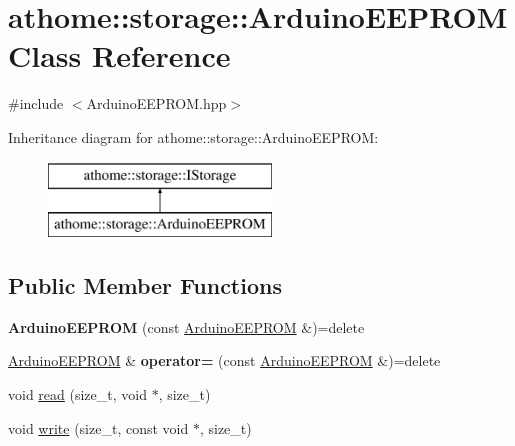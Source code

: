 \hypertarget{classathome_1_1storage_1_1_arduino_e_e_p_r_o_m}{}\section{athome\+:\+:storage\+:\+:Arduino\+E\+E\+P\+R\+OM Class Reference}
\label{classathome_1_1storage_1_1_arduino_e_e_p_r_o_m}


{\ttfamily \#include $<$Arduino\+E\+E\+P\+R\+O\+M.\+hpp$>$}

Inheritance diagram for athome\+:\+:storage\+:\+:Arduino\+E\+E\+P\+R\+OM\+:\begin{figure}[H]
\begin{center}
\leavevmode
\includegraphics[height=2.000000cm]{classathome_1_1storage_1_1_arduino_e_e_p_r_o_m}
\end{center}
\end{figure}
\subsection*{Public Member Functions}
\begin{DoxyCompactItemize}
\item 
\mbox{\label{classathome_1_1storage_1_1_arduino_e_e_p_r_o_m_acd5307c1483893ec3d378299dbf882bf}} 
{\bfseries Arduino\+E\+E\+P\+R\+OM} (const \mbox{\hyperlink{classathome_1_1storage_1_1_arduino_e_e_p_r_o_m}{Arduino\+E\+E\+P\+R\+OM}} \&)=delete
\item 
\mbox{\label{classathome_1_1storage_1_1_arduino_e_e_p_r_o_m_a58b6acc1fbf55445a2dbb20879dc4860}} 
\mbox{\hyperlink{classathome_1_1storage_1_1_arduino_e_e_p_r_o_m}{Arduino\+E\+E\+P\+R\+OM}} \& {\bfseries operator=} (const \mbox{\hyperlink{classathome_1_1storage_1_1_arduino_e_e_p_r_o_m}{Arduino\+E\+E\+P\+R\+OM}} \&)=delete
\item 
void \mbox{\hyperlink{classathome_1_1storage_1_1_arduino_e_e_p_r_o_m_a853674189981dd3395ea76911d2eb1a0}{read}} (size\+\_\+t, void $\ast$, size\+\_\+t)
\item 
void \mbox{\hyperlink{classathome_1_1storage_1_1_arduino_e_e_p_r_o_m_a20027ab8a5b20c1fad3e3e42daafe53d}{write}} (size\+\_\+t, const void $\ast$, size\+\_\+t)
\end{DoxyCompactItemize}


